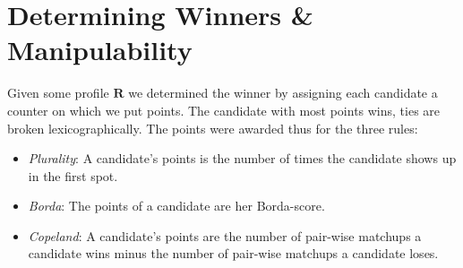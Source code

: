 \documentclass[10pt,a4paper]{article}
\begin{document}
\section{Determining Winners \& Manipulability}
Given some profile $\mathbf{R}$ we determined the winner by assigning each candidate a counter on which we put points. The candidate with most points wins, ties are broken lexicographically. The points were awarded thus for the three rules:
\begin{itemize}
\item \textit{Plurality}: A candidate's points is the number of times the candidate shows up in the first spot.
\item \textit{Borda}: The points of a candidate are her Borda-score.
\item \textit{Copeland}: A candidate's points are the number of pair-wise matchups a candidate wins minus the number of pair-wise matchups a candidate loses.
\end{itemize}
\end{document}
